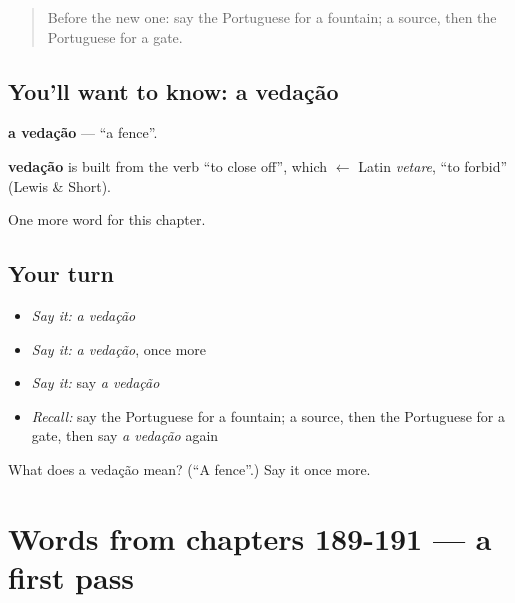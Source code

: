 \label{lesson:PT-C194-vedacao}



\begin{quote}
Before the new one: say the Portuguese for a fountain; a source, then the Portuguese for a gate.
\end{quote}

\subsection*{You'll want to know: a vedação}
\textbf{a vedação} — \textquotedblleft{}a fence\textquotedblright{}.

\begin{cousinweb}
\textbf{vedação} is built from the verb \textquotedblleft{}to close off\textquotedblright{}, which $\leftarrow$ Latin \emph{vetare}, \textquotedblleft{}to forbid\textquotedblright{} (Lewis \& Short).
\end{cousinweb}

\begin{grammarlens}[title={What you've built}]
One more word for this chapter.
\end{grammarlens}

\subsection*{Your turn}
\begin{itemize}
\raggedright
  \item \emph{Say it:} \emph{a vedação}
  \item \emph{Say it:} \emph{a vedação}, once more
  \item \emph{Say it:} say \emph{a vedação}
  \item \emph{Recall:} say the Portuguese for a fountain; a source, then the Portuguese for a gate, then say \emph{a vedação} again
\end{itemize}

\begin{tcolorbox}[breakable,colback=teal!4,colframe=teal!35!black,title={Before you move on}]
What does a vedação mean? (\textquotedblleft{}A fence\textquotedblright{}.) Say it once more.
\end{tcolorbox}
\section[(dialogue)]{Words from chapters 189-191 — a first pass}

\label{lesson:PT-R194-first-pass-words-from-chapters-189-191}



